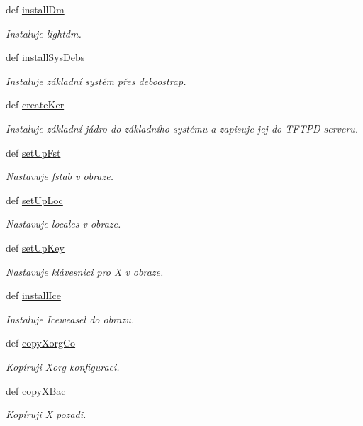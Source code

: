 \begin{DoxyCompactItemize}
def \hyperlink{classConfSys_1_1ConfSys_acc9747fb9c27ec9b502f05f8e9038e93}{install\-Dm}
\begin{DoxyCompactList}\small\item\em Instaluje lightdm. \end{DoxyCompactList}\item 
def \hyperlink{classConfSys_1_1ConfSys_a25b558cfd4ac44f9f75d82771079db7a}{install\-Sys\-Debs}
\begin{DoxyCompactList}\small\item\em Instaluje základní systém přes deboostrap. \end{DoxyCompactList}\item 
def \hyperlink{classConfSys_1_1ConfSys_a8b17a236bdf36c53b109b0d30add20a3}{create\-Ker}
\begin{DoxyCompactList}\small\item\em Instaluje základní jádro do základního systému a zapisuje jej do T\-F\-T\-P\-D serveru. \end{DoxyCompactList}\item 
def \hyperlink{classConfSys_1_1ConfSys_ab30f940b6063d918726bf098a1572dbd}{set\-Up\-Fst}
\begin{DoxyCompactList}\small\item\em Nastavuje fstab v obraze. \end{DoxyCompactList}\item 
def \hyperlink{classConfSys_1_1ConfSys_ad2121d426e037b6ad07d747231fe6370}{set\-Up\-Loc}
\begin{DoxyCompactList}\small\item\em Nastavuje locales v obraze. \end{DoxyCompactList}\item 
def \hyperlink{classConfSys_1_1ConfSys_a6cd13575cfed138a3fa2fdeecc567000}{set\-Up\-Key}
\begin{DoxyCompactList}\small\item\em Nastavuje klávesnici pro X v obraze. \end{DoxyCompactList}\item 
def \hyperlink{classConfSys_1_1ConfSys_a75c24373b7f98875cb36979db32affb6}{install\-Ice}
\begin{DoxyCompactList}\small\item\em Instaluje Iceweasel do obrazu. \end{DoxyCompactList}\item 
def \hyperlink{classConfSys_1_1ConfSys_ac1ae7ecf353bc1fd45635bdca5d7b3bc}{copy\-Xorg\-Co}
\begin{DoxyCompactList}\small\item\em Kopíruji Xorg konfiguraci. \end{DoxyCompactList}\item 
def \hyperlink{classConfSys_1_1ConfSys_a56c578bb874bfb2b0b3da19361ddf84b}{copy\-X\-Bac}
\begin{DoxyCompactList}\small\item\em Kopíruji X pozadi. \end{DoxyCompactList}\end{DoxyCompactItemize}
